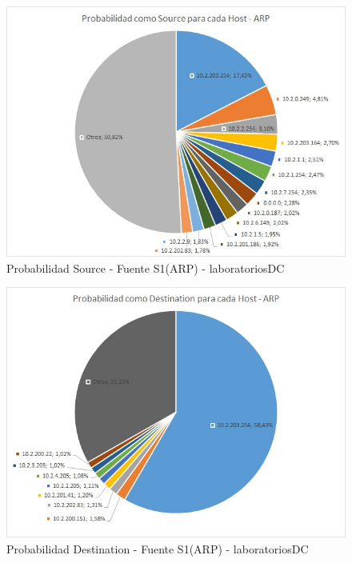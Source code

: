 \begin{figure}[h!]
\centering
\includegraphics[width=\textwidth]{./img/proba_src_laboDC.jpg}
\caption{Probabilidad Source - Fuente S1(ARP) - laboratoriosDC}
\end{figure}

\begin{figure}[h!]
\centering
\includegraphics[width=\textwidth]{./img/proba_dst_laboDC.jpg}
\caption{Probabilidad Destination - Fuente S1(ARP) - laboratoriosDC}
\end{figure}
\newpage

